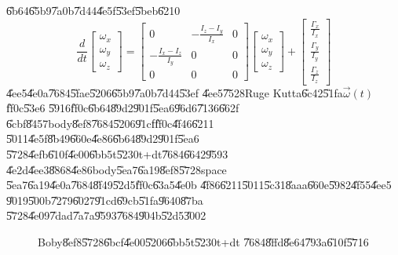 \documentclass[12pt]{article}
\begin{document}
\U{6b64}\U{65b9}\U{7a0b}\U{7d44}\U{4e5f}\U{53ef}\U{5beb}\U{6210}%
\begin{equation}
\frac{d}{dt}\left[ 
\begin{array}{c}
\omega _{x} \\ 
\omega _{y} \\ 
\omega _{z}%
\end{array}%
\right] =\left[ 
\begin{array}{ccc}
0 & -\frac{I_{z}-I_{y}}{I_{x}} & 0 \\ 
-\frac{I_{x}-I_{z}}{I_{y}} & 0 & 0 \\ 
0 & 0 & 0%
\end{array}%
\right] \left[ 
\begin{array}{c}
\omega _{x} \\ 
\omega _{y} \\ 
\omega _{z}%
\end{array}%
\right] +\left[ 
\begin{array}{c}
\frac{\Gamma _{x}}{I_{x}} \\ 
\frac{\Gamma _{y}}{I_{y}} \\ 
\frac{\Gamma _{z}}{I_{z}}%
\end{array}%
\right]
\end{equation}%
\U{4ee5}\U{4e0a}\U{7684}\U{5fae}\U{5206}\U{65b9}\U{7a0b}\U{7d44}\U{53ef}%
\U{4ee5}\U{7528}Ruge Kutta\U{6c42}\U{51fa}$\vec{\omega}(t)$\U{ff0c}\U{53e6}%
\U{5916}\U{ff0c}\U{6b64}\U{89d2}\U{901f}\U{5ea6}\U{96d6}\U{7136}\U{662f}%
\U{6cbf}\U{8457}body\U{8ef8}\U{7684}\U{5206}\U{91cf}\U{ff0c}\U{4f46}\U{6211}%
\U{5011}\U{4e5f}\U{8b49}\U{660e}\U{4e86}\U{6b64}\U{89d2}\U{901f}\U{5ea6}%
\U{5728}\U{4efb}\U{610f}\U{4e00}\U{6bb5}t\U{5230}t+dt\U{7684}\U{6642}\U{9593}%
\U{4e2d}\U{4ee3}\U{8868}\U{4e86}body\U{5ea7}\U{6a19}\U{8ef8}\U{5728}space%
\U{5ea7}\U{6a19}\U{4e0a}\U{7684}\U{8f49}\U{52d5}\U{ff0c}\U{63a5}\U{4e0b}%
\U{4f86}\U{6211}\U{5011}\U{5c31}\U{8aaa}\U{660e}\U{5982}\U{4f55}\U{4ee5}%
\U{9019}\U{500b}\U{7279}\U{6027}\U{91cd}\U{69cb}\U{51fa}\U{9640}\U{87ba}%
\U{5728}\U{4e09}\U{7dad}\U{7a7a}\U{9593}\U{7684}\U{904b}\U{52d5}\U{3002}%
\bigskip

\begin{figure}[th]
\caption{Boby\U{8ef8}\U{5728}\U{6bcf}\U{4e00}\U{5206}\U{6bb5}t\U{5230}t+dt%
\U{7684}\U{8ffd}\U{8e64}\U{793a}\U{610f}\U{5716}}
\begin{center}
\end{center}
\end{figure}
\end{document}
